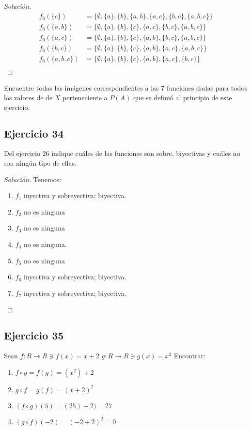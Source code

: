 \documentclass[a4paper,12pt]{article}
\newenvironment{solution}
  {\renewcommand\qedsymbol{$\blacksquare$}\begin{proof}[Solución]}
  {\end{proof}}
\begin{document}
\begin{enumerate}
\begin{solution}
\begin{align}
    f_6(\{c\}) &= \{\emptyset,\{a\},\{b\},\{a, b\},\{a, c\},\{b, c\},\{a, b, c\}\}\\
    f_6(\{a, b\}) &= \{\emptyset,\{a\},\{b\},\{c\},\{a, c\},\{b, c\},\{a, b, c\}\}\\
    f_6(\{a, c\}) &=  \{\emptyset,\{a\},\{b\},\{c\},\{a, b\},\{b, c\},\{a, b, c\}\}\\
    f_6(\{b, c\}) &=  \{\emptyset,\{a\},\{b\},\{c\},\{a, b\},\{a, c\},\{a, b, c\}\}\\
    f_6(\{a, b, c\}) &=\{\emptyset,\{a\},\{b\},\{c\},\{a, b\},\{a, c\},\{b, c\}\}\\
\end{align}
\end{solution}
\end{enumerate}

Encuentre todas las imágenes correspondientes a las 7 funciones dadas para todos los valores de de $X$ perteneciente a $P(A)$ que se definió al principio de este ejercicio. 

\subsection{Ejercicio 34}
Del ejercicio 26 indique cuáles de las funciones son sobre, biyectivas y cuáles no son ningún tipo de ellas.
\begin{solution}
Tenemos:
\begin{enumerate}
    \item $f_1$ inyectiva y sobreyectiva; biyectiva.
    \item $f_2$ no es ninguna
    \item $f_3$ no es ninguna
    \item $f_4$ no es ninguna.
    \item $f_5$ no es ninguna
    \item $f_6$ inyectiva y sobreyectiva; biyectiva.
    \item $f_7$ inyectiva y sobreyectiva; biyectiva.
\end{enumerate}
\end{solution}
\subsection{Ejercicio 35}
Sean $f: R\to R\ni f(x)=x+2$\newline 
$g: R\to R\ni g(x)=x^2$\newline 
Encontrar: \begin{enumerate}
    \item $f\circ g= f(g)= (x^2)+2$
    \item $g\circ f=g(f) = (x+2)^2$
    \item $(f\circ g)(5) = (25)+2)=27$
    \item $(g\circ f)(-2)= (-2+2)^2=0$
\end{enumerate}
\end{document}
